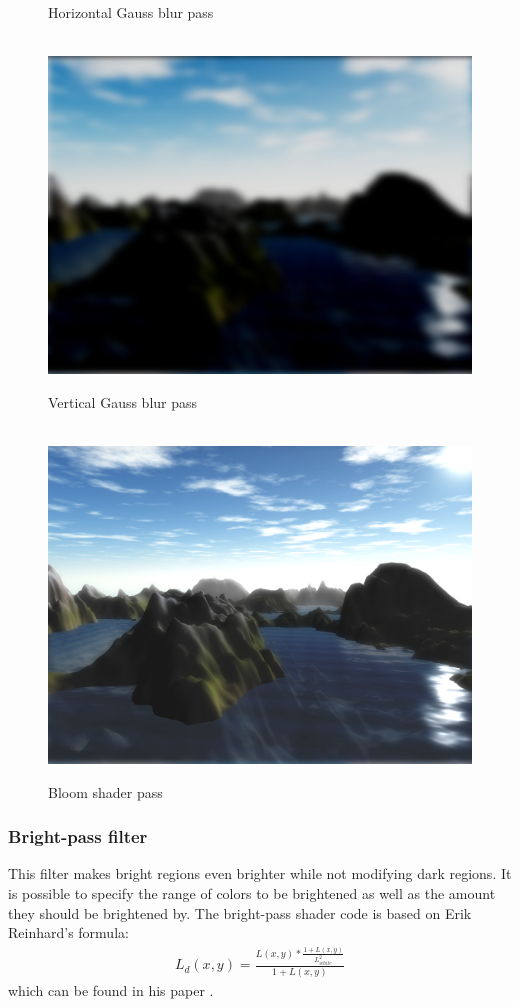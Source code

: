 \documentclass[11pt,a4paper,twoside,openright]{report}
\begin{document}
\begin{figure}[!htb]
  \caption{Horizontal Gauss blur pass}\label{fig:3rdpass}
\endminipage
\\
\centering
{}
  \includegraphics[width=\linewidth]{shader3-vertical-blur-screenshot.png}
  \caption{Vertical Gauss blur pass}\label{fig:4thpass}
\endminipage
{}
\
\endminipage
{}%
  \includegraphics[width=\linewidth]{shader4-bloom-screenshot.png}
  \caption{Bloom shader pass}\label{fig:5thpass}
\endminipage
\end{figure}

\subsubsection{Bright-pass filter}
This filter makes bright regions even brighter while not modifying dark regions. It is possible to specify the range of colors to be brightened as well as the amount they should be brightened by. The bright-pass shader code is based on Erik Reinhard's formula:
\begin{align*}
L_d(x,y) = \frac{L(x,y) * \frac{1 + L(x,y)}{L_{white}^2}}{1 + L(x,y)}
\end{align*}
which can be found in his paper \cite{Reinhard:2002:PTR:566570.566575}.
\end{document}
